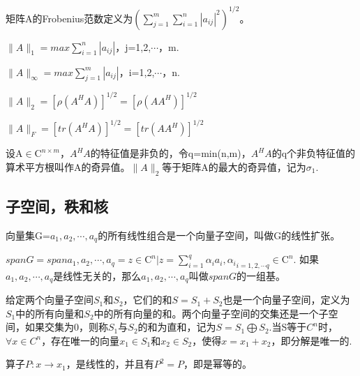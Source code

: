 \documentclass{article}
\begin{document}
矩阵A的Frobenius范数定义为$(\sum_{j=1}^m\sum_{i=1}^n |a_{ij}|^2)^{1/2}$。

$\parallel A\parallel_1 = max\sum_{i=1}^n |a_{ij}|$，j=1,2,$\cdots$，m.

$\parallel A\parallel_\infty= max\sum_{j=1}^m |a_{ij}|$，i=1,2,$\cdots$，n.

$\parallel A\parallel_2=[\rho(A^HA)]^{1/2}=[\rho(AA^H)]^{1/2}$

$\parallel A\parallel_F=[tr(A^HA)]^{1/2}=[tr(AA^H)]^{1/2}$

设A$\in\mathrm{C}^{n\times m}$，$A^HA$的特征值是非负的，令q=min(n,m)，$A^HA$的q个非负特征值的算术平方根叫作A的奇异值。$\parallel A\parallel_2$等于矩阵A的最大的奇异值，记为$\sigma_1$.

\subsection{子空间，秩和核}
向量集G={$a_1,a_2,\cdots,a_q$}的所有线性组合是一个向量子空间，叫做G的线性扩张。

$span{G}=span{a_1,a_2,\cdots,a_q}={z\in\mathrm{C}^n|z=\sum_{i=1}^q{\alpha _i a_i},{\alpha _i}_{i=1,2,\cdots q}\in\mathrm{C}^n}$.
如果$a_1,a_2,\cdots,a_q$是线性无关的，那么$a_1,a_2,\cdots,a_q$叫做$span{G}$的一组基。

给定两个向量子空间$S_1$和$S_2$，它们的和$S=S_1+S_2$也是一个向量子空间，定义为$S_1$中的所有向量和$S_2$中的所有向量的和。两个向量子空间的交集还是一个子空间，如果交集为{0}，则称$S_1$与$S_2$的和为直和，记为$S=S_1\bigoplus S_2$.当S等于$C^n$时，$\forall x\in C^n$，存在唯一的向量$x_1\in S_1$和$x_2\in S_2$，使得$x=x_1+x_2$，即分解是唯一的.

算子$P:x\longrightarrow x_1$，是线性的，并且有$P^2=P$，即是幂等的。




















\end{document}
